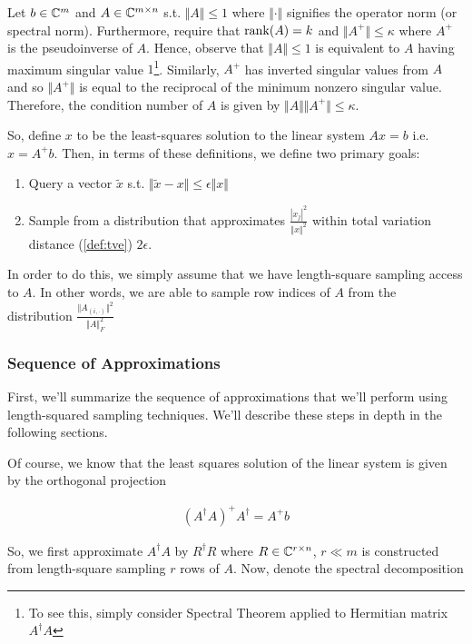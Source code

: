 \documentclass[main.tex]{subfiles}
\begin{document}
Let $b \in \mathbb{C}^m$ and $A \in \mathbb{C}^{m \times n}$ s.t. $\Vert A \Vert \leq 1$ where $\Vert \cdot \Vert$ signifies the operator norm (or spectral norm). Furthermore, require that $\rank(A) = k$ and $\Vert A^+ \Vert \leq \kappa$ where $A^+$ is the pseudoinverse of $A$. Hence, observe that $\Vert A \Vert \leq 1$ is equivalent to $A$ having maximum singular value $1$\footnote{To see this, simply consider Spectral Theorem applied to Hermitian matrix $A^\dag A$}. Similarly, $A^+$ has inverted singular values from $A$ and so $\Vert A^+ \Vert$ is equal to the reciprocal of the minimum nonzero singular value. Therefore, the condition number of $A$ is given by $\Vert A \Vert \Vert A^+ \Vert \leq \kappa$.

So, define $x$ to be the least-squares solution to the linear system $Ax = b$ i.e. $x = A^+ b$. Then, in terms of these definitions, we define two primary goals:

\begin{enumerate}
\item Query a vector $\tilde{x}$ s.t. $\Vert \tilde{x} - x \Vert \leq \epsilon \Vert x \Vert$
\item Sample from a distribution that approximates $\frac{|x_j|^2}{\Vert x \Vert^2}$ within total variation distance (\autoref{def:tve}) $2\epsilon$.
\end{enumerate}

In order to do this, we simply assume that we have length-square sampling access to $A$. In other words, we are able to sample row indices of $A$ from the distribution $\frac{\Vert A_{(i, \cdot)}\Vert^2}{\Vert A \Vert^2_F}$

\subsubsection{Sequence of Approximations}

First, we'll summarize the sequence of approximations that we'll perform using length-squared sampling techniques. We'll describe these steps in depth in the following sections.

Of course, we know that the least squares solution of the linear system is given by the orthogonal projection

\begin{align*}
	(A^\dag A)^+ A^\dag = A^+ b
\end{align*}

So, we first approximate $A^\dag A$ by $R^\dag R$ where $R \in \mathbb{C}^{r \times n}$, $r \ll m$ is constructed from length-square sampling $r$ rows of $A$. Now, denote the spectral decomposition 
\end{document}
